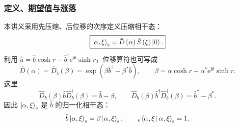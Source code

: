 \subsubsection{定义、期望值与涨落}
本讲义采用先压缩、后位移的次序定义压缩相干态：
\begin{equation}
\boxed{\Ket{\alpha,\xi}_{\mathrm{s}}
=\hat D\left(\alpha\right)\hat S\left(\xi\right)\Ket{0}.}
\label{eq:squeezed-coherent}
\end{equation}
利用
$\hat a=\hat b\cosh r-\hat b^\dagger\mathrm{e}^{\mathrm{i}\theta}\sinh r$，位移算符也可写成
\begin{equation}
\hat D\left(\alpha\right)=\hat D_b\left(\beta\right)
=\exp\left(\beta\hat b^\dagger-\beta^*\hat b\right),
\qquad
\beta=\alpha\cosh r+\alpha^*\mathrm{e}^{\mathrm{i}\theta}\sinh r.
\end{equation}
这里
\begin{equation}
\hat D_b\left(\beta\right)\hat b\hat D_b^\dagger\left(\beta\right)=\hat b-\beta,
\qquad
\hat D_b\left(\beta\right)\hat b^\dagger\hat D_b^\dagger\left(\beta\right)=\hat b^\dagger-\beta^*.
\end{equation}
因此 $\Ket{\alpha,\xi}_{\mathrm{s}}$ 是 $\hat b$ 的归一化相干态：
\begin{equation}
\hat b\Ket{\alpha,\xi}_{\mathrm{s}}
=\beta\Ket{\alpha,\xi}_{\mathrm{s}},
\qquad
{}_{\mathrm{s}}\Braket{\alpha,\xi|\alpha,\xi}_{\mathrm{s}}=1.
\end{equation}

